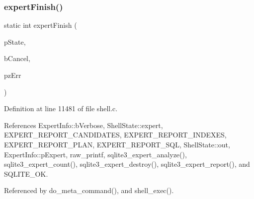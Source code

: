 \subsubsection{expert\+Finish()}
{\footnotesize\ttfamily static int expert\+Finish (\begin{DoxyParamCaption}\item[{\textbf{ Shell\+State} $\ast$}]{p\+State,  }\item[{int}]{b\+Cancel,  }\item[{char $\ast$$\ast$}]{pz\+Err }\end{DoxyParamCaption})\hspace{0.3cm}{\ttfamily [static]}}



Definition at line 11481 of file shell.\+c.



References Expert\+Info\+::b\+Verbose, Shell\+State\+::expert, E\+X\+P\+E\+R\+T\+\_\+\+R\+E\+P\+O\+R\+T\+\_\+\+C\+A\+N\+D\+I\+D\+A\+T\+ES, E\+X\+P\+E\+R\+T\+\_\+\+R\+E\+P\+O\+R\+T\+\_\+\+I\+N\+D\+E\+X\+ES, E\+X\+P\+E\+R\+T\+\_\+\+R\+E\+P\+O\+R\+T\+\_\+\+P\+L\+AN, E\+X\+P\+E\+R\+T\+\_\+\+R\+E\+P\+O\+R\+T\+\_\+\+S\+QL, Shell\+State\+::out, Expert\+Info\+::p\+Expert, raw\+\_\+printf, sqlite3\+\_\+expert\+\_\+analyze(), sqlite3\+\_\+expert\+\_\+count(), sqlite3\+\_\+expert\+\_\+destroy(), sqlite3\+\_\+expert\+\_\+report(), and S\+Q\+L\+I\+T\+E\+\_\+\+OK.



Referenced by do\+\_\+meta\+\_\+command(), and shell\+\_\+exec().


